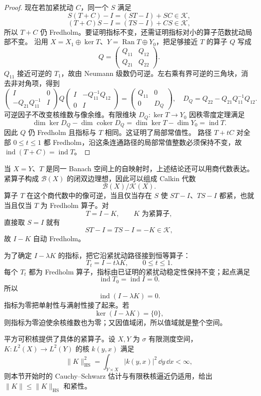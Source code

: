 \begin{proof}
现在若加紧扰动 $C$，同一个 $S$ 满足
\[
S(T+C)-I=(ST-I)+SC\in\mathcal K,
\]
\[
(T+C)S-I=(TS-I)+CS\in\mathcal K,
\]
所以 $T+C$ 仍 Fredholm。要证明指标不变，还需证明指标对小的算子范数扰动局部不变。
沿用 $X=X_1\oplus\ker T$、$Y=\operatorname{Ran}T\oplus Y_0$，把足够接近 $T$ 的算子 $Q$ 写成
\[
Q=\begin{pmatrix}Q_{11}&Q_{12}\\Q_{21}&Q_{22}\end{pmatrix}.
\]
$Q_{11}$ 接近可逆的 $T_1$，故由 Neumann 级数仍可逆。左右乘有界可逆的三角块，消去非对角项，得到
\[
\begin{pmatrix}I&0\\-Q_{21}Q_{11}^{-1}&I\end{pmatrix}
Q
\begin{pmatrix}I&-Q_{11}^{-1}Q_{12}\\0&I\end{pmatrix}
=\begin{pmatrix}Q_{11}&0\\0&D_Q\end{pmatrix},
\quad D_Q=Q_{22}-Q_{21}Q_{11}^{-1}Q_{12}.
\]
可逆因子不改变核维数与像余维。有限维块 $D_Q:\ker T\to Y_0$ 因秩零度定理满足
\[
\dim\ker D_Q-\dim\operatorname{coker}D_Q
=\dim\ker T-\dim Y_0=\operatorname{ind}T.
\]
因此 $Q$ 仍 Fredholm 且指标与 $T$ 相同。这证明了局部常值性。
路径 $T+tC$ 对全部 $0\le t\le1$ 都 Fredholm，沿这条连通路径的局部常值整数必须保持不变，故 $\operatorname{ind}(T+C)=\operatorname{ind}T$。
\end{proof}


当 $X=Y$、$T$ 是同一 Banach 空间上的自映射时，上述结论还可以用商代数表达。紧算子构成 $\mathcal B(X)$ 的闭双边理想，因此可以组成 Calkin 代数
\[
\mathcal B(X)/\mathcal K(X).
\]
算子 $T$ 在这个商代数中的像可逆，当且仅当存在 $S$ 使 $ST-I$、$TS-I$ 都紧，也就当且仅当 $T$ 为 Fredholm 算子。对
\[
T=I-K,
\qquad K\text{ 为紧算子},
\]
直接取 $S=I$ 就有
\[
ST-I=TS-I=-K\in\mathcal K,
\]
故 $I-K$ 自动 Fredholm。

为了确定 $I-\lambda K$ 的指标，把它沿紧扰动路径接到恒等算子：
\[
T_t=I-t\lambda K,
\qquad0\le t\le1.
\]
每个 $T_t$ 都为 Fredholm 算子，指标由已证明的紧扰动稳定性保持不变；起点满足
\[
\operatorname{ind}T_0=\operatorname{ind}I=0.
\]
所以
\begin{equation*}{
\operatorname{ind}(I-\lambda K)=0.
}\end{equation*}
指标为零把单射性与满射性接了起来。若
\[
\ker(I-\lambda K)=\{0\},
\]
则指标为零迫使余核维数也为零；又因值域闭，所以值域就是整个空间。

平方可积核提供了具体的紧算子。设 $X,Y$ 为 $\sigma$ 有限测度空间，$K:L^2(X)\to L^2(Y)$ 的核 $k(y,x)$ 满足
\[
\|K\|_{\mathrm{HS}}^2=\int_{Y\times X}|k(y,x)|^2\,\dd y\,\dd x<\infty,
\]
则本节开始时的 Cauchy--Schwarz 估计与有限秩核逼近仍适用，给出 $\|K\|\le\|K\|_{\mathrm{HS}}$ 和紧性。

